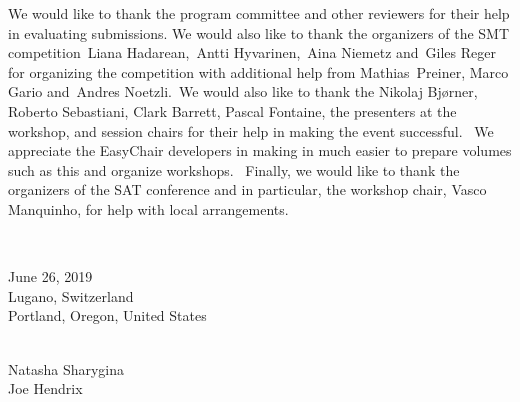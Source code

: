 \documentclass{easychair}
\begin{document}
We would like to thank the program committee and other reviewers for
their help in evaluating submissions. We would also like to thank the
organizers of the SMT competition\ Liana Hadarean,\ Antti
Hyvarinen,\ Aina Niemetz and\ Giles Reger for organizing the
competition with additional help from Mathias\ Preiner, Marco Gario
and\ Andres Noetzli.\ We would also like to thank the Nikolaj
Bj{\o}rner, Roberto Sebastiani, Clark Barrett, Pascal Fontaine, the
presenters at the workshop, and session chairs for their help in
making the event successful. \ We appreciate the EasyChair developers
in making in much easier to prepare volumes such as this and organize
workshops. \ Finally, we would like to thank the organizers of the SAT
conference and in particular, the workshop chair, Vasco Manquinho, for
help with local arrangements.


~\bigskip


\noindent
\begin{minipage}[t]{.4\textwidth}
June 26, 2019\\
Lugano, Switzerland\\
Portland, Oregon, United States
\end{minipage}%
\hfill
\begin{minipage}[t]{.4\textwidth}\flushright
\ \\
Natasha Sharygina\\
Joe Hendrix
\end{minipage}
\end{document}
